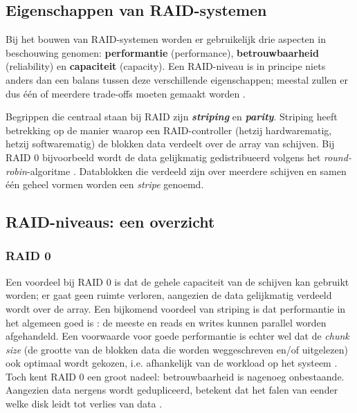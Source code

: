 \subsection{Eigenschappen van RAID-systemen}

Bij het bouwen van RAID-systemen worden er gebruikelijk drie aspecten in beschouwing genomen: \textbf{\gls{performantie}} (performance), \textbf{\gls{betrouwbaarheid}} (reliability) en \textbf{\gls{capaciteit}} (capacity). Een RAID-niveau is in principe niets anders dan een balans tussen deze verschillende eigenschappen; meestal zullen er dus één of meerdere trade-offs moeten gemaakt worden \autocite{Chen1994}.

Begrippen die centraal staan bij RAID zijn \textit{\textbf{\gls{striping}}} en \textit{\textbf{\gls{parity}}}. Striping heeft betrekking op de manier waarop een RAID-controller (hetzij hardwarematig, hetzij softwarematig) de blokken data verdeelt over de array van schijven. Bij RAID 0 bijvoorbeeld wordt de data gelijkmatig gedistribueerd volgens het \textit{\gls{round-robin}}-algoritme \autocite{OSThreePiecesRemzi2015}. Datablokken die verdeeld zijn over meerdere schijven en samen één geheel vormen worden een \textit{stripe} genoemd. \\ 

\subsection{RAID-niveaus: een overzicht}

\subsubsection{RAID 0}

Een voordeel bij RAID 0 is dat de gehele \gls{capaciteit} van de schijven kan gebruikt worden; er gaat geen ruimte verloren, aangezien de data gelijkmatig verdeeld wordt over de array. Een bijkomend voordeel van \gls{striping} is dat \gls{performantie} in het algemeen goed is \autocite{OSThreePiecesRemzi2015} : de meeste en reads en writes kunnen parallel worden afgehandeld. Een voorwaarde voor goede \gls{performantie} is echter wel dat de \textit{chunk size} (de grootte van de blokken data die worden weggeschreven en/of uitgelezen) ook optimaal wordt gekozen, i.e. afhankelijk van de workload op het systeem \autocite{OSThreePiecesRemzi2015}. Toch kent RAID 0 een groot nadeel: \gls{betrouwbaarheid} is nagenoeg onbestaande. Aangezien data nergens wordt gedupliceerd, betekent dat het falen van eender welke disk leidt tot verlies van data \autocite{OSThreePiecesRemzi2015}.

